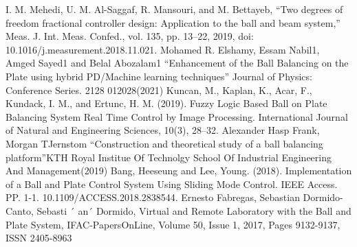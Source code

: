 \documentclass[conference]{IEEEtran}
\begin{document}
\begin{thebibliography}{00}
 I. M. Mehedi, U. M. Al-Saggaf, R. Mansouri, and M. Bettayeb, “Two degrees of freedom fractional controller design: Application to the ball and beam system,” Meas. J. Int. Meas. Confed., vol. 135, pp. 13–22, 2019, doi: 10.1016/j.measurement.2018.11.021. 
 Mohamed R. Elshamy, Essam Nabil1, Amged Sayed1 and Belal Abozalam1 “Enhancement of the Ball Balancing on the Plate using hybrid PD/Machine learning techniques” Journal of Physics: Conference Series. 2128 012028(2021)
 Kuncan, M., Kaplan, K., Acar, F., Kundack, I. M., and Ertunc, H. M. (2019). Fuzzy Logic Based Ball on Plate Balancing System Real Time Control by Image Processing. International Journal of Natural and Engineering Sciences, 10(3), 28–32.
 Alexander Hasp Frank, Morgan TJernstom “Construction and theoretical study of a ball balancing platform”KTH Royal Institue Of Technolgy School Of Industrial Engineering And Management(2019)
 Bang, Heeseung and Lee, Young. (2018). Implementation of a Ball and Plate Control System Using Sliding Mode Control. IEEE Access. PP. 1-1. 10.1109/ACCESS.2018.2838544.
  Ernesto Fabregas, Sebastian Dormido-Canto, Sebasti ´ an´ Dormido, Virtual and Remote Laboratory with the Ball and Plate System, IFAC-PapersOnLine, Volume 50, Issue 1, 2017, Pages 9132-9137, ISSN 2405-8963
\end{thebibliography}
\end{document}
